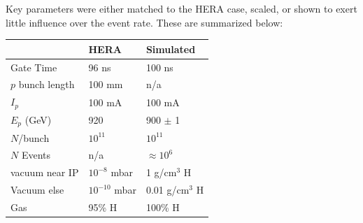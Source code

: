 Key parameters were either matched to the HERA case, scaled, or shown to exert little influence over the event rate.  These are summarized below:
\begin{center}
	\begin{tabular}{ l l l } 
		   & HERA & Simulated \\ 
		\hline \hline
		Gate Time & 96 ns & 100 ns \\ 
		$p$ bunch length & 100 mm & n/a \\ 
		$I_p$ & 100 mA & 100 mA\\
		$E_p$ (GeV)& 920 & 900 $\pm$ 1 \\
		$N$/bunch & $10^{11}$ & $10^{11}$\\
		$N$ Events & n/a & $\approx 10^6$\\
		vacuum near IP& $10^{-8}$ mbar  & 1 g/cm$^3$ H \\
		Vacuum else& $10^{-10}$ mbar & 0.01 g/cm$^3$ H\\
		Gas & 95\% H & 100\% H\\
		\hline
	\end{tabular}
\end{center}


